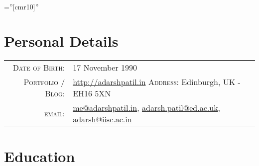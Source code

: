 \documentclass[a4paper,10pt]{article} %
\begin{document}
\pagestyle{empty} %

\font\fb=''[cmr10]'' %


\par{\bigskip\par} %

\section{Personal Details}

\begin{tabular}{rl}
\textsc{Date of Birth:} & 17 November 1990 \\
\textsc{Portfolio / Blog:} & \href{http://adarshpatil.in/timewarp}{http://adarshpatil.in} \hspace{1cm} \textsc{Address:} Edinburgh, UK - EH16 5XN\\
\textsc{email:} & \href{mailto:me@adarshpatil.in}{me@adarshpatil.in}, \href{mailto:adarsh.patil@ed.ac.uk}{adarsh.patil@ed.ac.uk}, \href{mailto:adarsh@iisc.ac.in}{adarsh@iisc.ac.in}\\
\end{tabular}


\section{Education}
\end{document}
